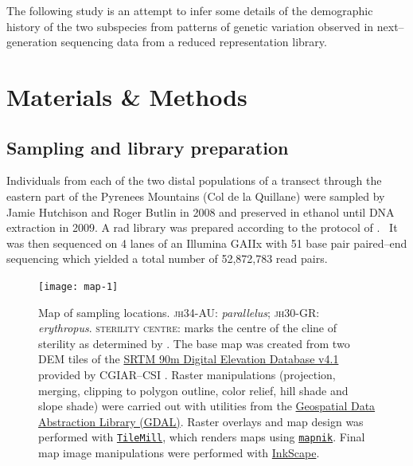 \documentclass[a4paper,12pt,times,print,index,custombib,custommargin]{PhDThesisPSnPDF}\usepackage[]{graphicx}\usepackage[]{color}
\begin{document}
The following study is an attempt to infer some details of the demographic history of the two subspecies from patterns of genetic variation observed in next--generation sequencing data from a reduced representation library.

%
%
%
\section{Materials \& Methods}
%
%
%
%
%
\subsection{Sampling and library preparation}

Individuals from each of the two distal populations of a transect through the eastern part of the Pyrenees Mountains (Col de la Quillane) were sampled by Jamie Hutchison and Roger Butlin in 2008 and preserved in ethanol until DNA extraction in 2009. A \gls{rad} library was prepared according to the protocol of \cite{Baird2008}. ~It was then sequenced on 4 lanes of an Illumina GAIIx with 51 base pair paired--end sequencing which yielded a total number of 52,872,783 read pairs.
%
\begin{figure}[htb]
\centering
\texttt{[image: map-1]}
\caption{Map of sampling locations. \textsc{jh34-AU}: \textit{parallelus}; \textsc{jh30-GR}: \textit{erythropus}. \textsc{sterility centre}: marks the centre of the cline of sterility as determined by \cite{Shuker2005}. 
{\scriptsize The base map was created from two \gls{DEM} tiles  of the \href{http://www.cgiar-csi.org/data/srtm-90m-digital-elevation-database-v4-1}{SRTM 90m Digital Elevation Database v4.1} provided by CGIAR--CSI \citep{Jarvis2008}. Raster manipulations (projection, merging, clipping to polygon outline, color relief, hill shade and slope shade)  were carried out with utilities from the \href{www.gdal.org}{Geospatial Data Abstraction Library (GDAL)}. Raster overlays and map design was performed with \href{https://tilemill-project.github.io/tilemill/}{\texttt{TileMill}}, which renders maps using \href{http://mapnik.org/}{\texttt{mapnik}}. Final map image manipulations were performed with \href{https://inkscape.org/en/}{InkScape}.}
}
\label{Fig:sampling-sites-map}
\end{figure}
%

%
%
\end{document}
